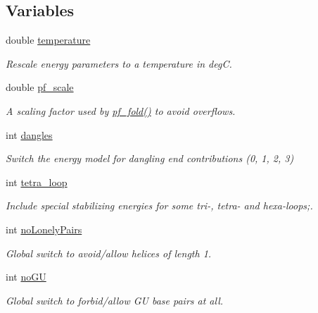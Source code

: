 \subsection*{Variables}
\begin{DoxyCompactItemize}
\item 
double \hyperlink{group__model__details_gab4b11c8d9c758430960896bc3fe82ead}{temperature}
\begin{DoxyCompactList}\small\item\em Rescale energy parameters to a temperature in degC. \end{DoxyCompactList}\item 
double \hyperlink{group__model__details_gad3b22044065acc6dee0af68931b52cfd}{pf\+\_\+scale}
\begin{DoxyCompactList}\small\item\em A scaling factor used by \hyperlink{group__pf__fold_gadc3db3d98742427e7001a7fd36ef28c2}{pf\+\_\+fold()} to avoid overflows. \end{DoxyCompactList}\item 
int \hyperlink{group__model__details_ga72b511ed1201f7e23ec437e468790d74}{dangles}
\begin{DoxyCompactList}\small\item\em Switch the energy model for dangling end contributions (0, 1, 2, 3) \end{DoxyCompactList}\item 
int \hyperlink{group__model__details_ga4f6265bdf0ead7ff4628a360adbfd77e}{tetra\+\_\+loop}
\begin{DoxyCompactList}\small\item\em Include special stabilizing energies for some tri-\/, tetra-\/ and hexa-\/loops;. \end{DoxyCompactList}\item 
int \hyperlink{group__model__details_ga097eccaabd6ae8b4fef83cccff85bb5d}{no\+Lonely\+Pairs}
\begin{DoxyCompactList}\small\item\em Global switch to avoid/allow helices of length 1. \end{DoxyCompactList}\item 
\mbox{\label{group__model__details_gabf380d09e4f1ab94fc6af57cf0ad5d32}} 
int \hyperlink{group__model__details_gabf380d09e4f1ab94fc6af57cf0ad5d32}{no\+GU}
\begin{DoxyCompactList}\small\item\em Global switch to forbid/allow GU base pairs at all. \end{DoxyCompactList}\item 

\end{DoxyCompactItemize}

